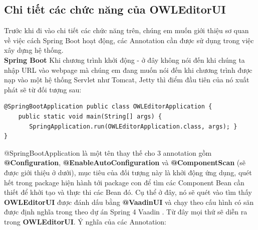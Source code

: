 \subsection{Chi tiết các chức năng của OWLEditorUI}
Trước khi đi vào chi tiết các chức năng trên, chúng em muốn giới thiệu sơ quan về việc cách Spring Boot \cite{springboot} hoạt động, các Annotation cần được sử dụng trong việc xây dựng hệ thống.
\\
\textbf{Spring Boot} Khi chương trình khởi động - ở đây không nói đến khi chúng ta nhập URL vào webpage mà chúng em đang muốn nói đến khi chương trình được nạp vào một hệ thống Servlet như Tomcat, Jetty thì điểm đầu tiên của nó xuất phát sẽ từ đối tượng sau:
\begin{verbatim}
@SpringBootApplication public class OWLEditorApplication {
    public static void main(String[] args) {
       SpringApplication.run(OWLEditorApplication.class, args); }
}
\end{verbatim} 
@SpringBootApplication là một tên thay thế cho 3 annotation gồm \textbf{@Configuration}, \textbf{@EnableAutoConfiguration} và \textbf{@ComponentScan} (sẽ được giới thiệu ở dưới), mục tiêu của đối tượng này là khởi động ứng dụng, quét hết trong package hiện hành tới package con để tìm các Component Bean cần thiết để khởi tạo và thực thi các Bean đó. Cụ thể ở đây, nó sẽ quét vào tìm thấy \textbf{OWLEditorUI} được đánh dấu bằng \textbf{@VaadinUI} và chạy theo cấu hình có săn được định nghĩa trong theo dự án Spring 4 Vaadin \cite{spring4vaadin}. Từ đây mọi thứ sẽ diễn ra trong \textbf{OWLEditorUI}. Ý nghĩa của các Annotation:
